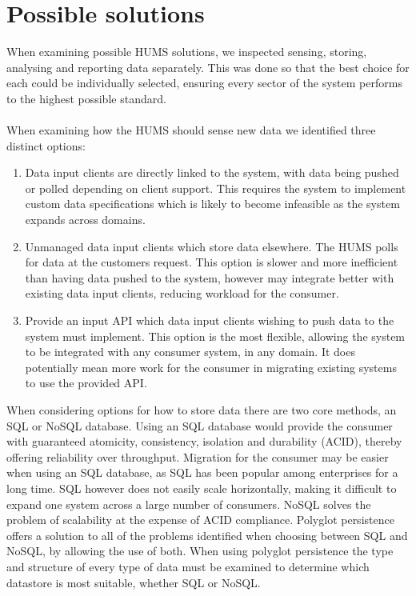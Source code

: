 \documentclass[10pt,a4paper]{article}
\begin{document}




\section{Possible solutions}
When examining possible HUMS solutions, we inspected sensing, storing, analysing and reporting data separately. This was done so that the best choice for each could be individually selected, ensuring every sector of the system performs to the highest possible standard. 
\\ \\
When examining how the HUMS should sense new data we identified three distinct options:
\begin{enumerate}
\item Data input clients are directly linked to the system, with data being pushed or polled depending on client support. This requires the system to implement custom data specifications which is likely to become infeasible as the system expands across domains.
\item Unmanaged data input clients which store data elsewhere. The HUMS polls for data at the customers request. This option is slower and more inefficient than having data pushed to the system, however may integrate better with existing data input clients, reducing workload for the consumer.
\item Provide an input API which data input clients wishing to push data to the system must implement. This option is the most flexible, allowing the system to be integrated with any consumer system, in any domain. It does potentially mean more work for the consumer in migrating existing systems to use the provided API. \\
\end{enumerate}
When considering options for how to store data there are two core methods, an SQL or NoSQL database. Using an SQL database would provide the consumer with guaranteed atomicity, consistency, isolation and durability (ACID), thereby offering reliability over throughput. Migration for the consumer may be easier when using an SQL database, as SQL has been popular among enterprises for a long time. SQL however does not easily scale horizontally, making it difficult to expand one system across a large number of consumers. NoSQL solves the problem of scalability at the expense of ACID compliance. Polyglot persistence offers a solution to all of the problems identified when choosing between SQL and NoSQL, by allowing the use of both. When using polyglot persistence the type and structure of every type of data must be examined to determine which datastore is most suitable, whether SQL or NoSQL.
\end{document}
